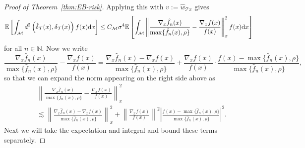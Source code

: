 \documentclass[preprint]{imsart}
\theoremstyle{plain}
\theoremstyle{definition}
\newcommand{\Nbb}{\mathbb{N}}
\newcommand{\Ebb}{\mathbb{E}}
\newcommand{\Mcal}{\mathcal{M}}
\newcommand{\diff}{\textnormal{d}}
\newcommand{\T}{\mathcal{T}}
\begin{document}
\begin{appendix}
\begin{proof}[Proof of Theorem~\ref{thm:EB-risk}]
    Applying this with $v:=\hat{w}_{\T x}$ gives
    \begin{equation}\label{eqn:EB-1}
        \Ebb\left[\int_{\Mcal}d^2\left(\hat{\delta}_{\T}(x),\delta_{\T}(x)\right)f(x)\diff x\right]
        \le
        C_\Mcal \sigma^4
        \Ebb\left[\int_{\Mcal}
        \left\|
        \frac{\nabla_x\hat f_n(x)}{\max\{\hat f_n(x),\rho\}}
        -
        \frac{\nabla_x f(x)}{f(x)}
        \right\|_x^2
        f(x)\diff x\right]
    \end{equation}
    for all $n\in\Nbb$.
    Now we write
    \begin{equation*}
        \frac{\nabla_x\hat{f}_n(x)}{\max\{\hat{f}_n(x),\rho\}}-\frac{\nabla_x f(x)}{f(x)} = \frac{\nabla_x\hat{f}_n(x)-\nabla_xf(x)}{\max\{\hat{f}_n(x),\rho\}} + \frac{\nabla_x f(x)}{f(x)}\cdot\frac{f(x) - \max\{\hat{f}_n(x),\rho\}}{\max\{\hat{f}_n(x),\rho\}},
    \end{equation*}
    so that we can expand the norm appearing on the right side above as
    \begin{align*}
        &\left\|\frac{\nabla_x\hat{f}_n(x)}{\max\{\hat{f}_n(x),\rho\}}-\frac{\nabla_x f(x)}{f(x)}\right\|^2_{x} \\
        &\lesssim \left\|\frac{\nabla_x\hat{f}_n(x)-\nabla_xf(x)}{\max\{\hat{f}_n(x),\rho\}}\right\|_{x}^2 + \left\|\frac{\nabla_x f(x)}{f(x)}\right\|^2\left|\frac{f(x) - \max\{\hat{f}_n(x),\rho\}}{\max\{\hat{f}_n(x),\rho\}}\right|^2.
    \end{align*}
    Next we will take the expectation and integral and bound these terms separately.


\end{proof}
\end{appendix}
\end{document}
